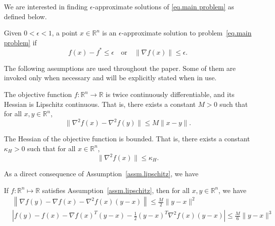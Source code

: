 \documentclass{mcom-l}
\numberwithin{equation}{section}
\begin{document}
We are interested in finding $\epsilon$-approximate solutions of \eqref{eq.main problem} as defined below.
\begin{definition}
    \label{def.approximate solution}
    Given $0<\epsilon <1$, a point $x \in \mathbb{R}^n$ is an $\epsilon$-approximate solution to problem~\eqref{eq.main problem} if
    \begin{equation}
        \label{eq.approximate solution}
        f(x) - f^* \leq \epsilon \quad \text{or} \quad \|\nabla f(x)\| \leq \epsilon.
    \end{equation}
\end{definition}
The following assumptions are used throughout the paper. Some of them are invoked only when necessary and will be explicitly stated when in use.
\begin{assumption}
    \label{assm.lipschitz}
    The objective function $f: \mathbb{R}^n \to \mathbb{R}$ is twice continuously differentiable, and its Hessian is Lipschitz continuous. That is, there exists a constant $M > 0$ such that for all $x, y \in \mathbb{R}^n$,
    \begin{equation}
        \label{eq.main assm}
        \|\nabla^2 f(x) - \nabla^2 f(y)\| \leq M \|x - y\|. \end{equation}
\end{assumption}
\begin{assumption}
    \label{assm.bounded hessian}
    The Hessian of the objective function is bounded. That is, there exists a constant $\kappa_H > 0$ such that for all $x \in \mathbb{R}^n$, \begin{equation}
        \label{eq.bounded hessian}
        \|\nabla^2 f(x)\| \leq \kappa_H.
    \end{equation}
\end{assumption}
As a direct consequence of Assumption~\ref{assm.lipschitz}, we have
\begin{lemma}\label{lem.lipschitz}
    If \(f:\mathbb{R}^n \mapsto \mathbb{R}\) satisfies Assumption~\ref{assm.lipschitz}, then for all \(x,y\in \mathbb{R}^n\), we have
    \begin{subequations}
        \begin{align}
            \label{eq.first-order exp}
             & \left\|\nabla f(y)-\nabla f(x)-\nabla^{2} f(x)(y-x)\right\|                       \leq \frac{M}{2}\|y-x\|^{2} \\
            \label{eq.second-order exp}
             & \left|f(y)-f(x)-\nabla f(x)^T(y-x)-\frac{1}{2}(y-x)^T\nabla^{2} f(x)(y-x)\right|  \leq \frac{M}{6}\|y-x\|^{3}
        \end{align}
    \end{subequations}
\end{lemma}
\end{document}
